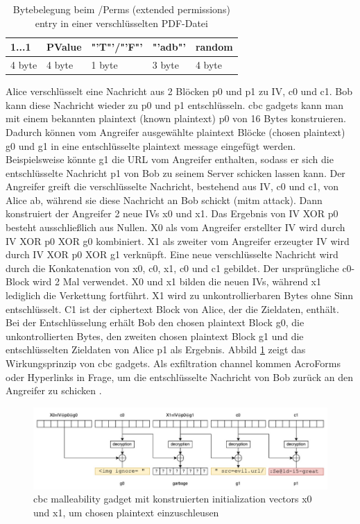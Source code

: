 \begin{table}[!htbp]
	\centering
	\begin{tabular}{|p{2cm}|p{2cm}|p{2cm}|p{2cm}|p{2cm}|}
	\hline
	\textbf{1...1}	& \textbf{PValue} 	& \textbf{"'T"'/"'F"'} 	& \textbf{"'adb"'} 	& \textbf{random} 	\\ 
	\hline
	4 byte 			& 4 byte 			& 1 byte  				& 3 byte 			& 4 byte 			\\ 
	\hline
	\end{tabular}
	\caption{Bytebelegung beim /Perms (extended permissions) entry in einer verschlüsselten PDF-Datei \cite{ccc-break-pdf}}
	\label{table:perms}
\end{table}

Alice verschlüsselt eine Nachricht aus 2 Blöcken p0 und p1 zu IV, c0 und c1. Bob kann diese Nachricht wieder zu p0 und p1 entschlüsseln. \gls{cbc} gadgets kann man mit einem bekannten plaintext (known plaintext) p0 von 16 Bytes konstruieren. Dadurch können vom Angreifer ausgewählte plaintext Blöcke (chosen plaintext) g0 und g1 in eine entschlüsselte plaintext message eingefügt werden. Beispielsweise könnte g1 die URL vom Angreifer enthalten, sodass er sich die entschlüsselte Nachricht p1 von Bob zu seinem Server schicken lassen kann. Der Angreifer greift die verschlüsselte Nachricht, bestehend aus IV, c0 und c1, von Alice ab, während sie diese Nachricht an Bob schickt (\gls{mitm} attack). Dann konstruiert der Angreifer 2 neue IVs x0 und x1. Das Ergebnis von IV XOR p0 besteht ausschließlich aus Nullen. X0 als vom Angreifer erstellter IV wird durch IV XOR p0 XOR g0 kombiniert. X1 als zweiter vom Angreifer erzeugter IV wird durch IV XOR p0 XOR g1 verknüpft. Eine neue verschlüsselte Nachricht wird durch die Konkatenation von x0, c0, x1, c0 und c1 gebildet. Der ursprüngliche c0-Block wird 2 Mal verwendet. X0 und x1 bilden die neuen IVs, während x1 lediglich die Verkettung fortführt. X1 wird zu unkontrollierbaren Bytes ohne Sinn entschlüsselt. C1 ist der ciphertext Block von Alice, der die Zieldaten, enthält. Bei der Entschlüsselung erhält Bob den chosen plaintext Block g0, die unkontrollierten Bytes, den zweiten chosen plaintext Block g1 und die entschlüsselten Zieldaten von Alice p1 als Ergebnis. Abbild \ref{fig:gadget} zeigt das Wirkungsprinzip von \gls{cbc} gadgets. Als exfiltration channel kommen AcroForms oder Hyperlinks in Frage, um die entschlüsselte Nachricht von Bob zurück an den Angreifer zu schicken \cite{gadget, ccc-break-pdf, crypto-web}.

\begin{figure}[!htbp]
	\centering
	\includegraphics[width=1\textwidth]{"images/gadget2-gadget.png"}
	\caption{\gls{cbc} malleability gadget mit konstruierten initialization vectors x0 und x1, um chosen plaintext einzuschleusen \cite{gadget}}
	\label{fig:gadget}
\end{figure}

